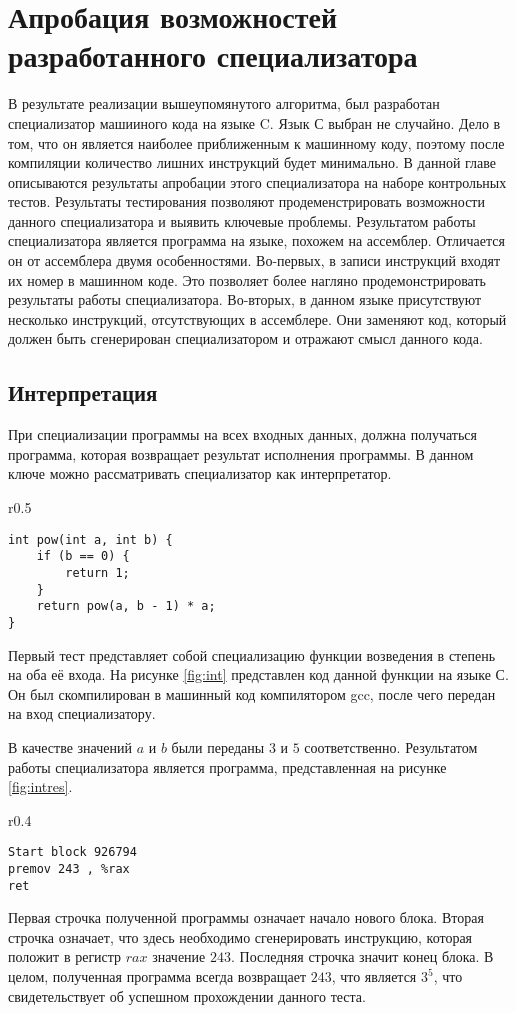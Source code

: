 \documentclass{spbau-diploma}
\begin{document}
\section{Апробация возможностей разработанного специализатора}
В результате реализации вышеупомянутого алгоритма, был разработан специализатор машииного кода на языке C. Язык С выбран не случайно. Дело в том, что он является наиболее приближенным к машинному коду, поэтому после компиляции количество лишних инструкций будет минимально. В данной главе описываются результаты апробации этого специализатора на наборе контрольных тестов. Результаты тестирования позволяют продеменстрировать возможности данного специализатора и выявить ключевые проблемы.
Результатом работы специализатора является программа на языке, похожем на ассемблер. Отличается он от ассемблера двумя особенностями. Во-первых, в записи инструкций входят их номер в машинном коде. Это позволяет более нагляно продемонстрировать результаты работы специализатора. Во-вторых, в данном языке присутствуют несколько инструкций, отсутствующих в ассемблере. Они заменяют код, который должен быть сгенерирован специализатором и отражают смысл данного кода.

\subsection{ Интерпретация}
При специализации программы на всех входных данных, должна получаться программа, которая возвращает результат исполнения программы. В данном ключе можно рассматривать специализатор как интерпретатор.
\begin{wrapfigure}{r}{0.5\textwidth}
\begin{lstlisting}[xleftmargin = 20pt]
int pow(int a, int b) {
    if (b == 0) {
        return 1;
    }
    return pow(a, b - 1) * a;
}
\end{lstlisting}
\caption{ Функция возведения в степень}
\label{fig:int}
\end{wrapfigure}
Первый тест представляет собой специализацию функции возведения в степень на оба её входа. На рисунке \ref{fig:int} представлен код данной функции на языке С. Он был скомпилирован в машинный код компилятором gcc, после чего передан на вход специализатору.

В качестве значений $a$ и $b$ были переданы $3$ и $5$ соответственно. Результатом работы специализатора является программа, представленная на рисунке \ref{fig:intres}.
\begin{wrapfigure}{r}{0.4\textwidth}
\begin{lstlisting}[xleftmargin = 20pt]
Start block 926794
premov 243 , %rax 
ret
\end{lstlisting}
\caption{ Результат специализации}
\label{fig:intres}
\end{wrapfigure}
Первая строчка полученной программы означает начало нового блока. Вторая строчка означает, что здесь необходимо сгенерировать инструкцию, которая положит в регистр $rax$ значение $243$. Последняя строчка значит конец блока. В целом, полученная программа всегда возвращает $243$, что является $3^5$, что свидетельствует об успешном прохождении данного теста. 
\end{document}
